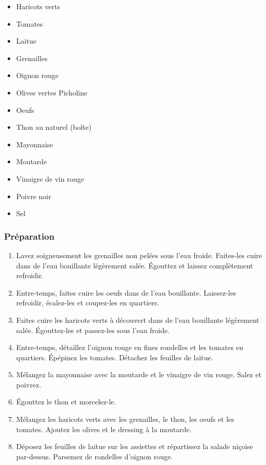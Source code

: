 \begin{multicols}{2}
	\begin{itemize}
		\item Haricots verts  
		\item Tomates  
		\item Laitue  
		\item Grenailles  
		\item Oignon rouge  
		\item Olives vertes Picholine  
		\item Oeufs  
		\item Thon au naturel (boîte)  
		\item Mayonnaise  
		\item Moutarde  
		\item Vinaigre de vin rouge  
		\item Poivre noir
		\item Sel
	\end{itemize}
\end{multicols}


\subsubsection*{Préparation}

\begin{enumerate}
	\item Lavez soigneusement les grenailles non pelées sous l'eau froide.
	Faites-les cuire  dans de l'eau bouillante légèrement salée.
	Égouttez et laissez complètement refroidir.
	\item Entre-temps, faites cuire les oeufs  dans de l'eau bouillante.
	Laissez-les refroidir, écalez-les et coupez-les en quartiers.
	\item Faites cuire les haricots verts  à découvert dans de l'eau bouillante légèrement salée.
	Égouttez-les et passez-les sous l'eau froide.
	\item Entre-temps, détaillez l'oignon rouge en fines rondelles et les tomates en quartiers.
	Épépinez les tomates.
	Détachez les feuilles de laitue.
	\item Mélangez la mayonnaise avec la moutarde et le vinaigre de vin rouge.
	Salez et poivrez.
	\item Égouttez le thon et morcelez-le.
	\item Mélangez les haricots verts avec les grenailles, le thon, les oeufs et les tomates.
	Ajoutez les olives et le dressing à la moutarde.
	\item Déposez les feuilles de laitue sur les assiettes et répartissez la salade niçoise par-dessus.
	Parsemez de rondelles d'oignon rouge.
\end{enumerate}
